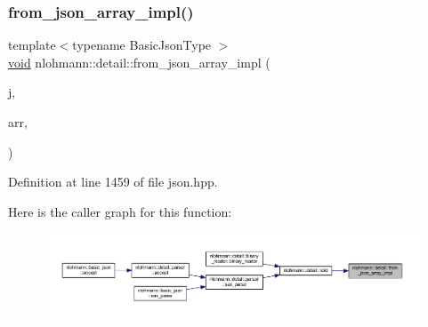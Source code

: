 \subsubsection{\texorpdfstring{from\_json\_array\_impl()}{from\_json\_array\_impl()}\hspace{0.1cm}{\footnotesize\ttfamily [1/4]}}
{\footnotesize\ttfamily template$<$typename Basic\+Json\+Type $>$ \\
\mbox{\hyperlink{namespacenlohmann_1_1detail_a59fca69799f6b9e366710cb9043aa77d}{void}} nlohmann\+::detail\+::from\+\_\+json\+\_\+array\+\_\+impl (\begin{DoxyParamCaption}\item[{const Basic\+Json\+Type \&}]{j,  }\item[{typename Basic\+Json\+Type\+::array\+\_\+t \&}]{arr,  }\item[{\mbox{\hyperlink{structnlohmann_1_1detail_1_1priority__tag}{priority\+\_\+tag}}$<$ 3 $>$}]{ }\end{DoxyParamCaption})}



Definition at line 1459 of file json.\+hpp.

Here is the caller graph for this function\+:
\nopagebreak
\begin{figure}[H]
\begin{center}
\leavevmode
\includegraphics[width=350pt]{namespacenlohmann_1_1detail_a40f7bb070a60e8ba14fffb9c117fcbd8_icgraph}
\end{center}
\end{figure}
\mbox{\label{namespacenlohmann_1_1detail_aba0ce45ebb69fd2c7132a00f9a56b503}} 
